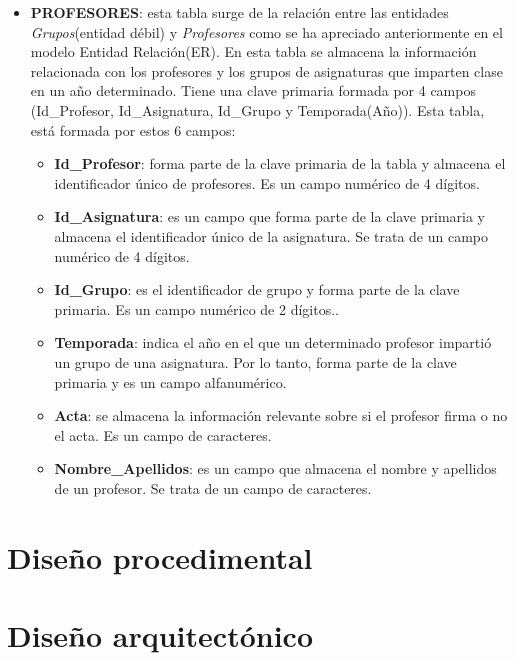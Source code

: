 \begin{itemize}
\item
\textbf{PROFESORES}: esta tabla surge de la relación entre las entidades \emph{Grupos}(entidad débil) y \emph{Profesores} como se ha apreciado anteriormente en el modelo Entidad Relación(ER). En esta tabla se almacena la información relacionada con los profesores y los grupos de asignaturas que imparten clase en un año determinado. Tiene una clave primaria formada por 4 campos (Id\_Profesor, Id\_Asignatura, Id\_Grupo y Temporada(Año)). Esta tabla, está formada por estos 6 campos:
\begin{itemize}
\item
\textbf{Id\_Profesor}: forma parte de la clave primaria de la tabla y almacena el identificador único de profesores. Es un campo numérico de 4 dígitos.
\item
\textbf{Id\_Asignatura}: es un campo que forma parte de la clave primaria y almacena el identificador único de la asignatura. Se trata de un campo numérico de 4 dígitos.
\item
\textbf{Id\_Grupo}: es el identificador de grupo y forma parte de la clave primaria. Es un campo numérico de 2 dígitos..
\item
\textbf{Temporada}: indica el año en el que un determinado profesor impartió un grupo de una asignatura. Por lo tanto, forma parte de la clave primaria y es un campo alfanumérico.
\item
\textbf{Acta}: se almacena la información relevante sobre si el profesor firma o no el acta. Es un campo de caracteres.
\item
\textbf{Nombre\_Apellidos}: es un campo que almacena el nombre y apellidos de un profesor. Se trata de un campo de caracteres.
\end{itemize}



\end{itemize}





\section{Diseño procedimental}

\section{Diseño arquitectónico}



